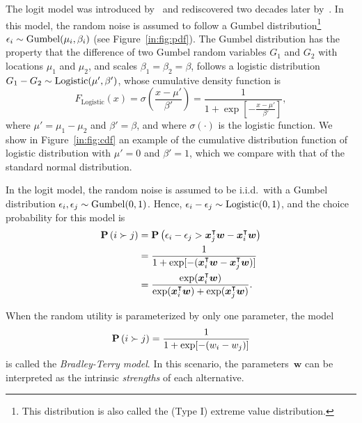 The logit model was introduced by~\citet{zermelo1928berechnung} and rediscovered two decades later by~\citet{bradley1952rank}.
In this model, the random noise is assumed to follow a Gumbel distribution\footnote{This distribution is also called the (Type I) extreme value distribution.} $\epsilon_i \sim \mathrm{Gumbel}( \mu_i, \beta_i )$ (see Figure~\ref{in:fig:pdf}).
The Gumbel distribution has the property that the difference of two Gumbel random variables $G_1$ and $G_2$ with locations $\mu_1$ and $\mu_2$, and scales $\beta_1 = \beta_2 = \beta$, follows a logistic distribution $G_1 - G_2 \sim \mathrm{Logistic}( \mu', \beta' )$, whose cumulative density function is
\begin{equation*}
	F_{\text{Logistic}}(x)
	= \sigma\left(\frac{x - \mu'}{\beta'}\right)
	= \frac{1}{1 + \exp \left[ - \frac{x  - \mu'}{\beta'} \right]},
\end{equation*}
where $\mu' = \mu_1 - \mu_2$ and $\beta' = \beta$, and where $\sigma(\cdot)$ is the logistic function.
We show in Figure~\ref{in:fig:cdf} an example of the cumulative distribution function of logistic distribution with $\mu' = 0$ and $\beta' = 1$, which we compare with that of the standard normal distribution.

In the logit model, the random noise is assumed to be i.i.d.\ with a Gumbel distribution $\epsilon_i, \epsilon_j \sim \mathrm{Gumbel}( 0, 1 )$.
Hence, $\epsilon_i - \epsilon_j \sim \mathrm{Logistic}( 0, 1 )$, and  the choice probability for this model is
\begin{align*}
	\mathbf{P}\left( i \succ j \right) & = \mathbf{P}\left( \epsilon_i - \epsilon_j > \bm{x}_j^\intercal \bm{w} - \bm{x}_i^\intercal \bm{w} \right)              \\
	                 & = \frac{1}{1 + \exp[-(\bm{x}_i^\intercal \bm{w} - \bm{x}_j^\intercal \bm{w})]}                        \\
	                 & = \frac{\exp(\bm{x}_i^\intercal \bm{w})}{\exp(\bm{x}_i^\intercal \bm{w}) + \exp(\bm{x}_j^\intercal \bm{w})}.
\end{align*}

When the random utility is parameterized by only one parameter, the model
\begin{equation}
	\label{eq:bradley-terry}
	\mathbf{P}\left( i \succ j \right) = \frac{1}{1 + \exp[-(w_i - w_j)]}
\end{equation}
is called the \emph{Bradley-Terry model}.
In this scenario, the parameters~$\bm{w}$ can be interpreted as the intrinsic \emph{strengths} of each alternative.

